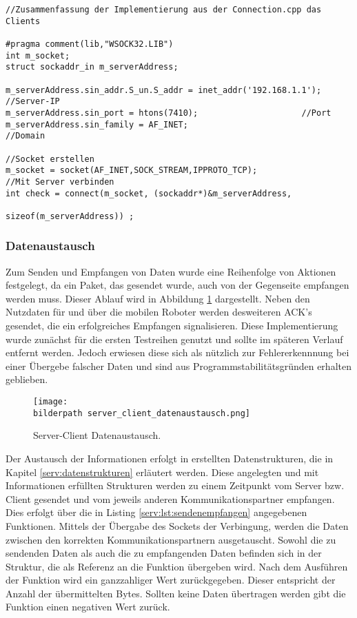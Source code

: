 \begin{lstlisting}[frame=tb,captionpos=b,caption=Socket Connection - Client., label=serv:lst:clientconn]
//Zusammenfassung der Implementierung aus der Connection.cpp das Clients

#pragma comment(lib,"WSOCK32.LIB")
int m_socket;
struct sockaddr_in m_serverAddress;

m_serverAddress.sin_addr.S_un.S_addr = inet_addr('192.168.1.1');	//Server-IP
m_serverAddress.sin_port = htons(7410);						//Port
m_serverAddress.sin_family = AF_INET;							//Domain	

//Socket erstellen
m_socket = socket(AF_INET,SOCK_STREAM,IPPROTO_TCP);
//Mit Server verbinden
int check = connect(m_socket, (sockaddr*)&m_serverAddress,
													sizeof(m_serverAddress)) ;
\end{lstlisting}

\subsubsection{Datenaustausch}
Zum Senden und Empfangen von Daten wurde eine Reihenfolge von Aktionen festgelegt, da ein Paket, das gesendet wurde, auch von der Gegenseite empfangen werden muss. Dieser Ablauf wird in Abbildung \ref{serv:fig:datenaustausch} dargestellt. Neben den Nutzdaten für und über die mobilen Roboter werden desweiteren ACK's gesendet, die ein erfolgreiches Empfangen signalisieren. Diese Implementierung wurde zunächst für die ersten Testreihen genutzt und sollte im späteren Verlauf entfernt werden. Jedoch erwiesen diese sich als nützlich zur Fehlererkennnung bei einer Übergebe falscher Daten und sind aus Programmstabilitätsgründen erhalten geblieben.

\begin{figure}[h]
	\centering	
	\texttt{[image: \\bilderpath server\_client\_datenaustausch.png]}
	\caption{Server-Client Datenaustausch.}
	\label{serv:fig:datenaustausch}
\end{figure}

Der Austausch der Informationen erfolgt in erstellten Datenstrukturen, die in Kapitel \ref{serv:datenstrukturen} erläutert werden. Diese angelegten und mit Informationen erfüllten Strukturen werden zu einem Zeitpunkt vom Server bzw. Client gesendet und vom jeweils anderen Kommunikationspartner empfangen. Dies erfolgt über die in Listing \ref{serv:lst:sendenempfangen} angegebenen Funktionen. Mittels der Übergabe des Sockets der Verbingung, werden die Daten zwischen den korrekten Kommunikationspartnern ausgetauscht. Sowohl die zu sendenden Daten als auch die zu empfangenden Daten befinden sich in der Struktur, die als Referenz an die Funktion übergeben wird. Nach dem Ausführen der Funktion wird ein ganzzahliger Wert zurückgegeben. Dieser entspricht der Anzahl der übermittelten Bytes. Sollten keine Daten übertragen werden gibt die Funktion einen negativen Wert zurück.

